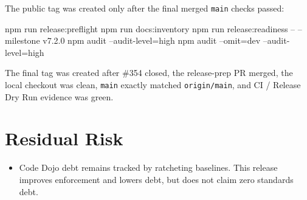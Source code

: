 The public tag was created only after the final merged \texttt{m\allowbreak{}a\allowbreak{}i\allowbreak{}n} checks passed:

\begin{CodeBlock}
npm run release:preflight
npm run docs:inventory
npm run release:readiness -- --milestone v7.2.0
npm audit --audit-level=high
npm audit --omit=dev --audit-level=high
\end{CodeBlock}

The final tag was created after \#354 closed, the release-prep PR merged, the local checkout was clean, \texttt{m\allowbreak{}a\allowbreak{}i\allowbreak{}n} exactly matched \texttt{o\allowbreak{}r\allowbreak{}i\allowbreak{}g\allowbreak{}i\allowbreak{}n\allowbreak{}/\allowbreak{}m\allowbreak{}a\allowbreak{}i\allowbreak{}n}, and CI / Release Dry Run evidence was green.

\section{Residual Risk}\label{record-261-residual-risk}

\begin{itemize}
\tightlist
\item
  Code Dojo debt remains tracked by ratcheting baselines. This release improves enforcement and lowers debt, but does not claim zero standards debt.
\end{itemize}

